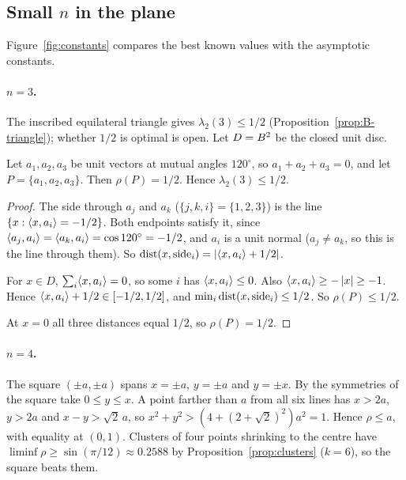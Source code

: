 \documentclass[11pt]{article}
\begin{document}
\subsection{Small \texorpdfstring{$n$}{n} in the plane}\label{sec:smalln}

Figure~\ref{fig:constants} compares the best known values with
the asymptotic constants.

\paragraph{$n=3$.} The inscribed equilateral triangle gives $\lambda_2(3)\le1/2$
(Proposition~\ref{prop:B-triangle}); whether $1/2$ is optimal is open. Let $D=B^2$ be the closed unit disc.

\begin{proposition}\label{prop:B-triangle}
Let $a_1, a_2, a_3$ be unit vectors at mutual angles $120^\circ$, so $a_1 + a_2 + a_3 = 0$, and let
$P = \{a_1, a_2, a_3\}$. Then $\rho(P) = 1/2$. Hence $\lambda_2(3) \le 1/2$.
\end{proposition}

\begin{proof}
The side through $a_j$ and $a_k$ ($\{j, k, i\} = \{1, 2, 3\}$) is the line
$\{x : \langle x,a_i\rangle = -1/2\}$. Both endpoints satisfy it, since
$\langle a_j,a_i\rangle = \langle a_k,a_i\rangle = \cos 120^\circ = -1/2$, and $a_i$ is a unit normal ($a_j \ne a_k$,
so this is the line through them). So $\operatorname{dist}(x, \mathrm{side}_i) = \left|\langle x,a_i\rangle + 1/2\right|$.

For $x \in D$, $\sum_i \langle x,a_i\rangle = 0$, so some $i$ has $\langle x,a_i\rangle \le 0$. Also
$\langle x,a_i\rangle \ge -\left|x\right| \ge -1$. Hence $\langle x,a_i\rangle + 1/2 \in [-1/2, 1/2]$, and
$\min_i \operatorname{dist}(x, \mathrm{side}_i) \le 1/2$. So $\rho(P) \le 1/2$.

At $x = 0$ all three distances equal $1/2$, so $\rho(P) = 1/2$.
\end{proof}

\paragraph{$n=4$.} The square $(\pm a,\pm a)$ spans $x=\pm a$, $y=\pm a$ and $y=\pm x$. By the
symmetries of the square take $0\le y\le x$. A point farther than $a$ from all six lines has $x>2a$,
$y>2a$ and $x-y>\sqrt2\,a$, so $x^2+y^2>(4+(2+\sqrt2)^2)a^2=1$. Hence $\rho\le a$, with equality at
$(0,1)$. Clusters of four points shrinking to the centre have $\liminf\rho\ge\sin(\pi/12)\approx0.2588$ by
Proposition~\ref{prop:clusters} ($k=6$), so the square beats them.
\end{document}
